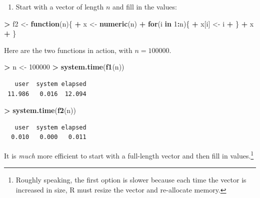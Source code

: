 \documentclass[]{krantz}
\makeatletter
\newenvironment{Shaded}{\begin{snugshade}}{\end{snugshade}}
\newcommand{\KeywordTok}[1]{\textcolor[rgb]{0.27,0.27,0.27}{\textbf{#1}}}
\newcommand{\DecValTok}[1]{\textcolor[rgb]{0.06,0.06,0.06}{#1}}
\newcommand{\StringTok}[1]{\textcolor[rgb]{0.5,0.5,0.5}{#1}}
\newcommand{\ControlFlowTok}[1]{\textcolor[rgb]{0.27,0.27,0.27}{\textbf{#1}}}
\newcommand{\OperatorTok}[1]{\textcolor[rgb]{0.43,0.43,0.43}{\textbf{#1}}}
\newcommand{\NormalTok}[1]{#1}
\providecommand{\tightlist}{%
  \setlength{\itemsep}{0pt}\setlength{\parskip}{0pt}}
\newenvironment{kframe}{%
\medskip{}
\setlength{\fboxsep}{.8em}
 \def\at@end@of@kframe{}%
 \ifinner\ifhmode%
  \def\at@end@of@kframe{\end{minipage}}%
  \begin{minipage}{\columnwidth}%
 \fi\fi%
 \def\FrameCommand##1{\hskip\@totalleftmargin \hskip-\fboxsep
 \colorbox{shadecolor}{##1}\hskip-\fboxsep
     \hskip-\linewidth \hskip-\@totalleftmargin \hskip\columnwidth}%
 \MakeFramed {\advance\hsize-\width
   \@totalleftmargin\z@ \linewidth\hsize
   \@setminipage}}%
 {\par\unskip\endMakeFramed%
 \at@end@of@kframe}
\renewenvironment{Shaded}{\begin{kframe}}{\end{kframe}}
\makeatother
\begin{document}
\begin{enumerate}
\def\labelenumi{\arabic{enumi}.}
\setcounter{enumi}{1}
\tightlist
\item
  Start with a vector of length \(n\) and fill in the values:
\end{enumerate}

\begin{Shaded}
\begin{Highlighting}[]
\OperatorTok{>}\StringTok{ }\NormalTok{f2 <-}\StringTok{ }\ControlFlowTok{function}\NormalTok{(n)\{}
\OperatorTok{+}\StringTok{     }\NormalTok{x <-}\StringTok{ }\KeywordTok{numeric}\NormalTok{(n)}
\OperatorTok{+}\StringTok{     }\ControlFlowTok{for}\NormalTok{(i }\ControlFlowTok{in} \DecValTok{1}\OperatorTok{:}\NormalTok{n)\{}
\OperatorTok{+}\StringTok{         }\NormalTok{x[i] <-}\StringTok{ }\NormalTok{i}
\OperatorTok{+}\StringTok{     }\NormalTok{\}}
\OperatorTok{+}\StringTok{     }\NormalTok{x}
\OperatorTok{+}\StringTok{ }\NormalTok{\}}
\end{Highlighting}
\end{Shaded}

Here are the two functions in action, with \(n = 100000\).

\begin{Shaded}
\begin{Highlighting}[]
\OperatorTok{>}\StringTok{ }\NormalTok{n <-}\StringTok{ }\DecValTok{100000}
\OperatorTok{>}\StringTok{ }\KeywordTok{system.time}\NormalTok{(}\KeywordTok{f1}\NormalTok{(n))}
\end{Highlighting}
\end{Shaded}

\begin{verbatim}
   user  system elapsed 
 11.986   0.016  12.094 
\end{verbatim}

\begin{Shaded}
\begin{Highlighting}[]
\OperatorTok{>}\StringTok{ }\KeywordTok{system.time}\NormalTok{(}\KeywordTok{f2}\NormalTok{(n))}
\end{Highlighting}
\end{Shaded}

\begin{verbatim}
   user  system elapsed 
  0.010   0.000   0.011 
\end{verbatim}

It is \emph{much} more efficient to start with a full-length vector and
then fill in values.\footnote{Roughly speaking, the first option is
  slower because each time the vector is increased in size, R must
  resize the vector and re-allocate memory.}
\end{document}
